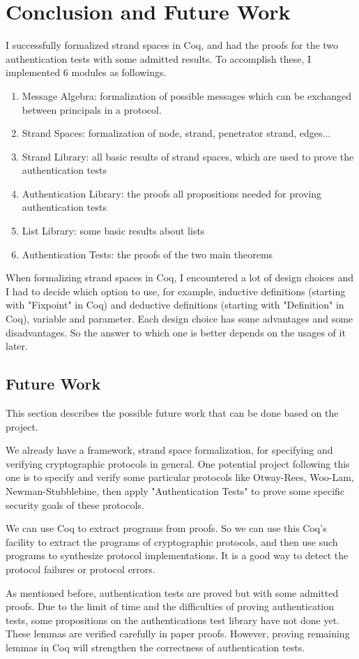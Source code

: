 \chapter{Conclusion and Future Work}
I successfully formalized strand spaces in Coq, and had the proofs for the
two authentication tests with some admitted results. To accomplish these, I implemented 6 modules as followings.
\begin{enumerate}
\item Message Algebra: formalization of possible messages which can be exchanged between principals in a protocol.
\item Strand Spaces: formalization of node, strand, penetrator strand, edges...
\item Strand Library: all basic results of strand spaces, which are used to prove the authentication tests
\item Authentication Library: the proofs all propositions needed for proving authentication tests
\item List Library: some basic results about lists
\item Authentication Tests: the proofs of the two main theorems
\end{enumerate}
When formalizing strand spaces in Coq, I encountered a lot of design choices and I had to decide which option to use, for example, inductive definitions (starting with "Fixpoint" in Coq) and deductive definitions (starting with "Definition" in Coq), variable and parameter. Each design choice has some advantages and some disadvantages. So the answer to which one is better depends on the usages of it later.
 
\section{Future Work}
This section describes the possible future work that can be done based on the project. 

We already have a framework, strand space formalization, for specifying and verifying cryptographic protocols in general. One potential project following this one is to specify and verify some particular protocols like Otway-Rees, Woo-Lam, Newman-Stubblebine, then apply "Authentication Tests" to prove some specific security goals of these protocols.

We can use Coq to extract programs from proofs. So we can use this Coq's facility to extract the programs of cryptographic protocols, and then use such programs to synthesize protocol implementations. It is a good way to detect the protocol failures or protocol errors. 

As mentioned before, authentication tests are proved but with some admitted proofs. 
Due to the limit of time and the difficulties of proving authentication tests, some propositions on the authentications test library have not done yet. These lemmas are verified carefully in paper proofs. However, proving remaining lemmas in Coq will strengthen the correctness of authentication tests.



